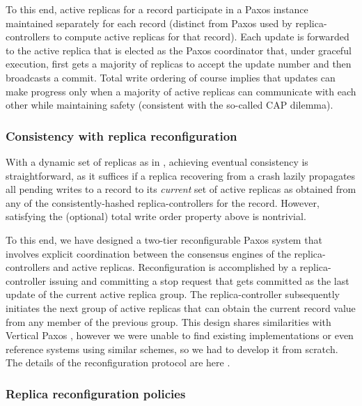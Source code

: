 To this end, active replicas for a record participate in a Paxos instance maintained separately for each record (distinct from Paxos used by replica-controllers to compute active replicas for that record). Each update is forwarded to the active replica that is elected as the Paxos coordinator that, under graceful execution, first gets a majority of replicas to accept the update number and then broadcasts a commit. Total write ordering of course implies that updates can make progress  only when a majority of active replicas can communicate with each other while maintaining safety (consistent with the so-called CAP dilemma).

\vsp
\subsubsection{Consistency with replica reconfiguration}
\label{sec:reconfiguration}

With a dynamic set of replicas as in \auspice, achieving eventual consistency is straightforward, as it suffices if a replica recovering from a crash lazily propagates all pending writes to a record to its {\em current} set of active replicas as obtained from any of the consistently-hashed replica-controllers for the record. However, satisfying the (optional) total write order property above is nontrivial.

To this end, we have designed a two-tier reconfigurable Paxos system that involves explicit coordination between the consensus engines of the replica-controllers and active replicas. Reconfiguration is accomplished by a replica-controller issuing and committing a stop request 
that gets committed as the last update of the current active replica group. The replica-controller subsequently initiates the next group of active replicas that can obtain the current record value from any member of the previous group. This design shares similarities with Vertical Paxos \cite{vertical-paxos}, however we were unable to find existing implementations or even reference systems using similar schemes, so we had to develop it from scratch. The details of the reconfiguration protocol are here \cite{techreport}.


\subsubsection{Replica reconfiguration policies}
\label{sec:reconf_policy}


